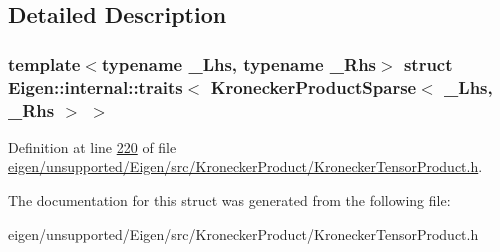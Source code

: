 \subsection{Detailed Description}
\subsubsection*{template$<$typename \+\_\+\+Lhs, typename \+\_\+\+Rhs$>$\newline
struct Eigen\+::internal\+::traits$<$ Kronecker\+Product\+Sparse$<$ \+\_\+\+Lhs, \+\_\+\+Rhs $>$ $>$}



Definition at line \hyperlink{eigen_2unsupported_2_eigen_2src_2_kronecker_product_2_kronecker_tensor_product_8h_source_l00220}{220} of file \hyperlink{eigen_2unsupported_2_eigen_2src_2_kronecker_product_2_kronecker_tensor_product_8h_source}{eigen/unsupported/\+Eigen/src/\+Kronecker\+Product/\+Kronecker\+Tensor\+Product.\+h}.



The documentation for this struct was generated from the following file\+:\begin{DoxyCompactItemize}
\item 
eigen/unsupported/\+Eigen/src/\+Kronecker\+Product/\+Kronecker\+Tensor\+Product.\+h\end{DoxyCompactItemize}
